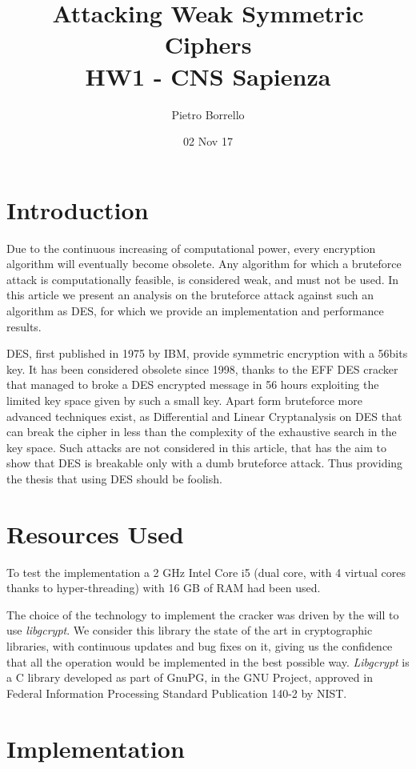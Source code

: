 \documentclass[11pt]{article}
\title{Attacking Weak Symmetric Ciphers \\ \bigskip \large HW1 - CNS Sapienza}
\author{Pietro Borrello}
\date{02 Nov 17}
\begin{document}
  \maketitle

  \section{Introduction}
  Due to the continuous increasing of computational power, every encryption algorithm will eventually become obsolete.
  Any algorithm for which a bruteforce attack is computationally feasible, is considered weak, and must not be used. In this article we present an analysis on the bruteforce attack against such an algorithm as DES, for which we provide an implementation and performance results.

  DES, first published in 1975 by IBM, provide symmetric encryption with a 56bits key. It has been considered obsolete since 1998, thanks to the EFF DES cracker \cite{descracker} that managed to broke a DES encrypted message in 56 hours exploiting the limited key space given by such a small key. Apart form bruteforce more advanced techniques exist, as Differential and Linear Cryptanalysis on DES \cite{cryptanalysis} that can break the cipher in less than the complexity of the exhaustive search in the key space. Such attacks are not considered in this article, that has the aim to show that DES is breakable only with a dumb bruteforce attack. Thus providing the thesis that using DES should be foolish.

  \section{Resources Used}
  To test the implementation a 2 GHz Intel Core i5 (dual core, with 4 virtual cores thanks to hyper-threading) with 16 GB of RAM had been used.

  The choice of the technology to implement the cracker was driven by the will to use \textit{libgcrypt}. We consider this library the state of the art in cryptographic libraries, with continuous updates and bug fixes on it, giving us the confidence that all the operation would be implemented in the best possible way. \textit{Libgcrypt} is a C library developed as part of GnuPG, in the GNU Project, approved in Federal Information Processing Standard Publication 140-2 by NIST.

  \section{Implementation}
\end{document}

